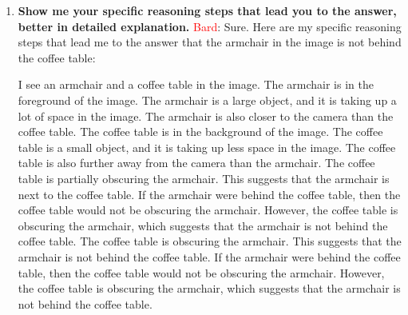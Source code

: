 \begin{enumerate}
    The armchair is in the foreground of the image. The armchair is a large object, and it is taking up a lot of space in the image. The armchair is also closer to the camera than the coffee table.
    The coffee table is in the background of the image. The coffee table is a small object, and it is taking up less space in the image. The coffee table is also further away from the camera than the armchair.
    The coffee table is partially obscuring the armchair. This suggests that the armchair is next to the coffee table.
    If the armchair were behind the coffee table, then the coffee table would not be obscuring the armchair. However, the coffee table is obscuring the armchair, which suggests that the armchair is not behind the coffee table.
    
    Therefore, the armchair in the image is not behind the coffee table. The armchair is next to the coffee table.
    \subitem Visual ChatGPT: The armchair is not behind the coffee table, it is located to the left of the coffee table.
    \subitem MiniGPT-4: No, the armchair is in front of the coffee table. The armchair is positioned near the coffee table, and they are facing each other. The armchair is on the right side of the coffee table, and the coffee table is on the left side of the armchair. There is a rug on the floor in front of the armchair and coffee table. The room has a neutral color scheme, with beige walls and light wood furniture. The lighting in the room is bright and evenly distributed.
    \item \textbf{Show me your specific reasoning steps that lead you to the answer, better in detailed explanation.}
    \subitem \textcolor{Red}{Bard}: 
    Sure. Here are my specific reasoning steps that lead me to the answer that the armchair in the image is not behind the coffee table:
    
    I see an armchair and a coffee table in the image.
    The armchair is in the foreground of the image. The armchair is a large object, and it is taking up a lot of space in the image. The armchair is also closer to the camera than the coffee table.
    The coffee table is in the background of the image. The coffee table is a small object, and it is taking up less space in the image. The coffee table is also further away from the camera than the armchair.
    The coffee table is partially obscuring the armchair. This suggests that the armchair is next to the coffee table.
    If the armchair were behind the coffee table, then the coffee table would not be obscuring the armchair. However, the coffee table is obscuring the armchair, which suggests that the armchair is not behind the coffee table.
    The coffee table is obscuring the armchair. This suggests that the armchair is not behind the coffee table. If the armchair were behind the coffee table, then the coffee table would not be obscuring the armchair. However, the coffee table is obscuring the armchair, which suggests that the armchair is not behind the coffee table.
    

\end{enumerate}
